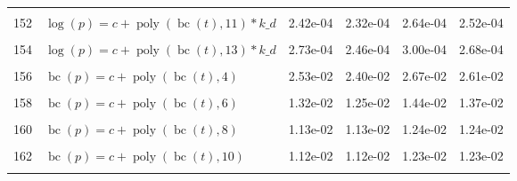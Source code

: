 \documentclass[12pt,a4paper]{article}
\DeclareMathOperator{\bc}{bc}
\DeclareMathOperator{\poly}{poly}
\begin{document}
\begin{longtable}[t]{ll>{\raggedleft\arraybackslash}p{2cm}>{\raggedleft\arraybackslash}p{2cm}>{\raggedleft\arraybackslash}p{2cm}>{\raggedleft\arraybackslash}p{2cm}}
\cellcolor{gray!6}{151} & \cellcolor{gray!6}{$\log(p) = c + \poly\left( \bc(t), 10 \right) * k\_d$} & \cellcolor{gray!6}{3.38e-04} & \cellcolor{gray!6}{3.04e-04} & \cellcolor{gray!6}{3.72e-04} & \cellcolor{gray!6}{3.33e-04}\\
152 & $\log(p) = c + \poly\left( \bc(t), 11 \right) * k\_d$ & 2.42e-04 & 2.32e-04 & 2.64e-04 & 2.52e-04\\
\cellcolor{gray!6}{153} & \cellcolor{gray!6}{$\log(p) = c + \poly\left( \bc(t), 12 \right) * k\_d$} & \cellcolor{gray!6}{2.10e-04} & \cellcolor{gray!6}{2.00e-04} & \cellcolor{gray!6}{2.27e-04} & \cellcolor{gray!6}{2.16e-04}\\
154 & $\log(p) = c + \poly\left( \bc(t), 13 \right) * k\_d$ & 2.73e-04 & 2.46e-04 & 3.00e-04 & 2.68e-04\\
\cellcolor{gray!6}{155} & \cellcolor{gray!6}{$\bc(p) = c + \poly\left( \bc(t), 3 \right)$} & \cellcolor{gray!6}{5.63e-02} & \cellcolor{gray!6}{2.07e-02} & \cellcolor{gray!6}{2.28e-02} & \cellcolor{gray!6}{2.19e-02}\\
156 & $\bc(p) = c + \poly\left( \bc(t), 4 \right)$ & 2.53e-02 & 2.40e-02 & 2.67e-02 & 2.61e-02\\
\cellcolor{gray!6}{157} & \cellcolor{gray!6}{$\bc(p) = c + \poly\left( \bc(t), 5 \right)$} & \cellcolor{gray!6}{1.45e-02} & \cellcolor{gray!6}{1.45e-02} & \cellcolor{gray!6}{1.51e-02} & \cellcolor{gray!6}{1.51e-02}\\
158 & $\bc(p) = c + \poly\left( \bc(t), 6 \right)$ & 1.32e-02 & 1.25e-02 & 1.44e-02 & 1.37e-02\\
\cellcolor{gray!6}{159} & \cellcolor{gray!6}{$\bc(p) = c + \poly\left( \bc(t), 7 \right)$} & \cellcolor{gray!6}{1.27e-02} & \cellcolor{gray!6}{1.19e-02} & \cellcolor{gray!6}{1.33e-02} & \cellcolor{gray!6}{1.30e-02}\\
160 & $\bc(p) = c + \poly\left( \bc(t), 8 \right)$ & 1.13e-02 & 1.13e-02 & 1.24e-02 & 1.24e-02\\
\cellcolor{gray!6}{161} & \cellcolor{gray!6}{$\bc(p) = c + \poly\left( \bc(t), 9 \right)$} & \cellcolor{gray!6}{1.14e-02} & \cellcolor{gray!6}{1.14e-02} & \cellcolor{gray!6}{1.25e-02} & \cellcolor{gray!6}{1.25e-02}\\
162 & $\bc(p) = c + \poly\left( \bc(t), 10 \right)$ & 1.12e-02 & 1.12e-02 & 1.23e-02 & 1.23e-02\\
\cellcolor{gray!6}{163} & \cellcolor{gray!6}{$\bc(p) = c + \poly\left( \bc(t), 11 \right)$} & \cellcolor{gray!6}{1.12e-02} & \cellcolor{gray!6}{1.12e-02} & \cellcolor{gray!6}{1.23e-02} & \cellcolor{gray!6}{1.23e-02}\\

\end{longtable}
\end{document}
